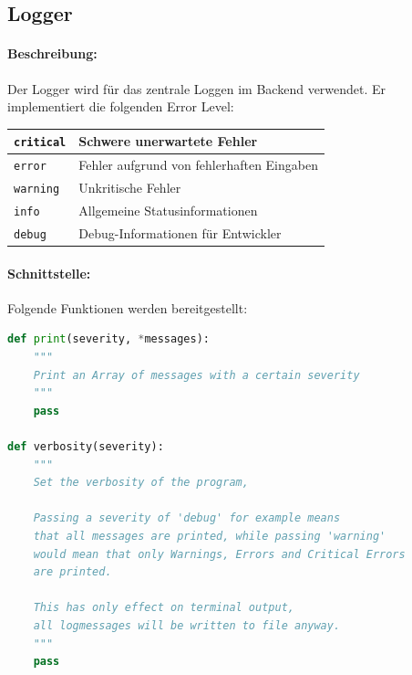 \subsection{Logger}
\paragraph{Beschreibung:}
\label{par:beschreibung}


\label{sub:logger}
Der Logger wird für das zentrale Loggen im Backend verwendet. Er implementiert die folgenden Error Level:

\begin{table}[h]
\centering
\begin{tabular}{|l|l|}
    \hline
    \texttt{critical} & Schwere unerwartete Fehler \\
    \hline
    \texttt{error} & Fehler aufgrund von fehlerhaften Eingaben \\
    \hline
    \texttt{warning} & Unkritische Fehler \\
    \hline
    \texttt{info} & Allgemeine Statusinformationen \\
    \hline
    \texttt{debug} & Debug-Informationen für Entwickler \\
    \hline
\end{tabular} 
\end{table}


\paragraph{Schnittstelle:}
\label{par:schnittstelle_}

Folgende Funktionen werden bereitgestellt:
\begin{lstlisting}[language=python]
def print(severity, *messages):
    """
    Print an Array of messages with a certain severity
    """
    pass

def verbosity(severity):
    """
    Set the verbosity of the program, 

    Passing a severity of 'debug' for example means
    that all messages are printed, while passing 'warning'
    would mean that only Warnings, Errors and Critical Errors 
    are printed.

    This has only effect on terminal output,
    all logmessages will be written to file anyway.
    """
    pass
\end{lstlisting}

